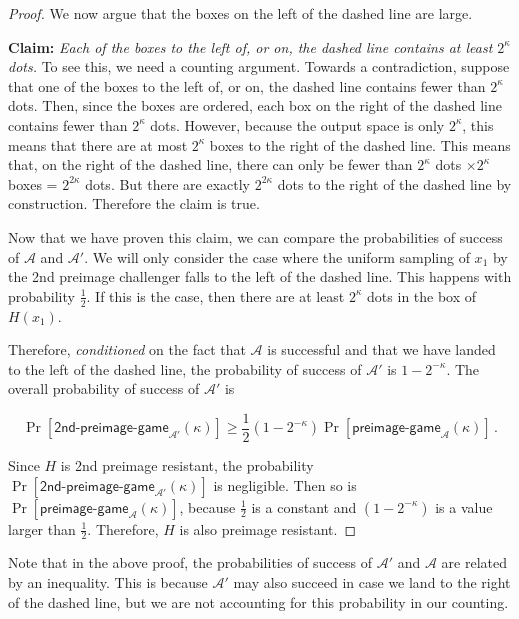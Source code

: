 \begin{proof}
  We now argue that the boxes on the left of the dashed line are large.

  \textbf{Claim: } \emph{Each of the boxes to the left of, or on, the dashed line contains at least $2^\kappa$ dots.} To see this, we need a counting argument. Towards a contradiction, suppose that one of the boxes to the left of, or on, the dashed line contains fewer than $2^\kappa$ dots. Then, since the boxes are ordered, each box on the right of the dashed line contains fewer than $2^\kappa$ dots. However, because the output space is only $2^\kappa$, this means that there are at most $2^\kappa$ boxes to the right of the dashed line. This means that, on the right of the dashed line, there can only be fewer than $2^\kappa$ dots $\times 2^\kappa$ boxes = $2^{2\kappa}$ dots. But there are exactly $2^{2\kappa}$ dots to the right of the dashed line by construction. Therefore the claim is true.

  Now that we have proven this claim, we can compare the probabilities of success of $\mathcal{A}$ and $\mathcal{A}'$. We will only consider the case where the uniform sampling of $x_1$ by the 2nd preimage challenger falls to the left of the dashed line. This happens with probability $\frac{1}{2}$. If this is the case, then there are at least $2^{\kappa}$ dots in the box of $H(x_1)$.

  Therefore, \emph{conditioned} on the fact that $\mathcal{A}$ is successful and that we have landed to the left of the dashed line, the probability of success of $\mathcal{A}'$ is $1 - 2^{-\kappa}$. The overall probability of success of $\mathcal{A}'$ is

  \[
    \Pr[\textsf{2nd-preimage-game}_{\mathcal{A}'}(\kappa)] \geq \frac{1}{2} (1 - 2^{-\kappa}) \Pr[\textsf{preimage-game}_\mathcal{A}(\kappa)]\,.
  \]

  Since $H$ is 2nd preimage resistant, the probability $\Pr[\textsf{2nd-preimage-game}_{\mathcal{A}'}(\kappa)]$ is negligible.
  Then so is $\Pr[\textsf{preimage-game}_\mathcal{A}(\kappa)]$, because $\frac{1}{2}$ is a constant and $(1 - 2^{-\kappa})$ is a value larger than $\frac{1}{2}$. Therefore, $H$ is also preimage resistant.
\end{proof}

Note that in the above proof, the probabilities of success of $\mathcal{A}'$
and $\mathcal{A}$ are related by an inequality. This is because $\mathcal{A}'$
may also succeed in case we land to the right of the dashed line, but we are not
accounting for this probability in our counting.

